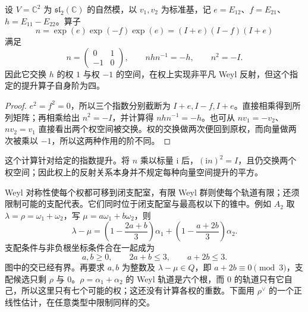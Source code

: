 \begin{proposition}[自然模上的反射提升]\label{b5:prop:sl2-reflection-lift}
	设 \(V=\mathbb C^2\) 为 \(\mathfrak{sl}_2(\mathbb C)\) 的自然模，以 \(v_1,v_2\) 为标准基，记 \(e=E_{12}\)、\(f=E_{21}\)、\(h=E_{11}-E_{22}\)。算子
	\[
		n=\exp(e)\exp(-f)\exp(e)=(I+e)(I-f)(I+e)
	\]
	满足
	\[
		n=\begin{pmatrix}0&1\\-1&0\end{pmatrix},\qquad
		nhn^{-1}=-h,\qquad n^2=-I.
	\]
	因此它交换 \(h\) 的权 \(1\) 与权 \(-1\) 的空间，在权上实现非平凡 Weyl 反射，但这个指定的提升算子自身阶为四。
\end{proposition}
\begin{proof}
	\(e^2=f^2=0\)，所以三个指数分别截断为 \(I+e,I-f,I+e\)。直接相乘得到所列矩阵；再相乘给出 \(n^2=-I\)，并计算得 \(nhn^{-1}=-h\)。也可从 \(nv_1=-v_2\)、\(nv_2=v_1\) 直接看出两个权空间被交换。权的交换做两次便回到原权，而向量做两次被乘以 \(-1\)，所以这两种作用的阶不同。
\end{proof}

这个计算针对给定的指数提升。将 \(n\) 乘以标量 \(\mathrm i\) 后，\((\mathrm i n)^2=I\)，且仍交换两个权空间；因此权上的反射关系本身并不规定每种向量空间提升的平方。

\ProseParagraphBreak
Weyl 对称性使每个权都可移到闭支配室，有限 Weyl 群则使每个轨道有限；还须限制可能的支配代表。它们同时位于闭支配室与最高权以下的锥中。例如 \(A_2\) 取 \(\lambda=\rho=\omega_1+\omega_2\)，写 \(\mu=a\omega_1+b\omega_2\)，则
\[
	\lambda-\mu=\left(1-\frac{2a+b}{3}\right)\alpha_1 +\left(1-\frac{a+2b}{3}\right)\alpha_2.
\]
支配条件与非负根坐标条件合在一起成为
\[
	a,b\ge0,\qquad 2a+b\le3,\qquad a+2b\le3.
\]
图中的交已经有界。再要求 \(a,b\) 为整数及 \(\lambda-\mu\in Q\)，即 \(a+2b\equiv0\pmod3\)，支配候选只剩 \(\rho\) 与 \(0\)。\(\rho=\alpha_1+\alpha_2\) 的 Weyl 轨道是六个根，而 \(0\) 的轨道只有它自己，所以这里只有七个可能的权；这还没有计算各权的重数。下面用 \(\rho^\vee\) 的一个正线性估计，在任意类型中限制同样的交。




